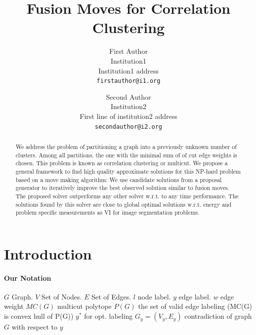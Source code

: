 \documentclass[10pt,twocolumn,letterpaper]{article}
\begin{document}

\title{Fusion Moves for Correlation Clustering}

\author{First Author\\
Institution1\\
Institution1 address\\
{\tt\small firstauthor@i1.org}
\and
Second Author\\
Institution2\\
First line of institution2 address\\
{\tt\small secondauthor@i2.org}
}

\maketitle


\listoftodos[Notes]
\begin{abstract}
   We address the problem of partitioning a  graph
   into a previously unknown number of clusters.
   Among all partitions, the one with the minimal 
   sum of of cut edge weights is chosen. 
   This problem is known as correlation clustering 
   or multicut.
   We propose a general framework to find
   high quality approximate solutions for 
   this NP-hard problem based on a move making algorithm:
   We use candidate solutions from a proposal generator
   to iteratively improve the best observed solution similar
   to fusion moves.
   The proposed solver outperforms any other solver
   w.r.t. to any time performance.
   The solutions found by this solver are close
   to global optimal solutions w.r.t. energy
   and problem specific measurements as VI for
   image segmentation problems.

\end{abstract}
\section{Introduction}


\paragraph{Our Notation}
$G$ Graph.
$V$ Set of Nodes.
$E$ Set of Edges.
$l$ node label.
$y$ edge label.
$w$ edge weight
$MC(G)$ multicut polytope
$P(G)$ the set of valid edge labeling (MC(G) is convex hull of P(G))
$y^*$ for opt. labeling
$G_y=(V_y,E_y)$ contradiction of graph $G$ with respect to $y$
\end{document}
